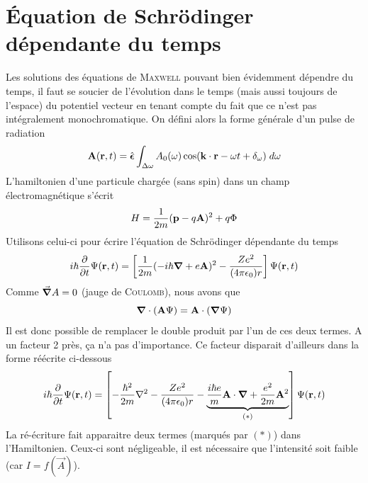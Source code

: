 \section{Équation de Schrödinger dépendante du temps}
Les solutions des équations de \textsc{Maxwell} pouvant bien évidemment dépendre du temps, il faut se
soucier de l'évolution dans le temps (mais aussi toujours de l'espace) du potentiel vecteur en tenant
compte du fait que ce n'est pas intégralement monochromatique. On défini alors la forme générale d'un
pulse de radiation
\begin{equation}
  {\bf A} ({\bf r}, t) 
= \hat{  \mbox{\boldmath $ \epsilon $}}
\int_{\Delta \omega} A_0 (\omega) 
   \cos ( {\bf k} \cdot {\bf r} - \omega t + 
\delta_{\omega} )  \; d \omega
\end{equation}
L'hamiltonien d'une particule chargée (sans spin) dans un champ électromagnétique s'écrit
\begin{equation}
H = \frac{1}{2m} ({\bf p} - q {\bf A} ) ^2 + q \Phi
\end{equation}
Utilisons celui-ci pour écrire l'équation de Schrödinger dépendante du temps
\begin{equation}
i \hbar \frac{\partial}{\partial t} \Psi ({\bf r}, t)
= \left[ \frac{1}{2m} (-i \hbar  \mbox{\boldmath $ \nabla $} + e {\bf A}) ^2
  - \frac{Ze^2}{(4 \pi \epsilon_0) r } \right] \Psi ({\bf r}, t)
\end{equation}
Comme $\vec\grad A=0$ (jauge de \textsc{Coulomb}), nous avons que
\begin{equation}
 \mbox{\boldmath $ \nabla $} \cdot ({\bf A} \Psi )
= {\bf A} \cdot (  \mbox{\boldmath $ \nabla $} \Psi)
\end{equation}
Il est donc possible de remplacer le double produit par l'un de ces deux termes. A un facteur 2 près,
ça n'a pas d'importance. Ce facteur disparait d'ailleurs dans la forme réécrite ci-dessous
\begin{equation}
i \hbar \frac{\partial}{\partial t} \Psi ({\bf r}, t) =\left[ -\frac{\hbar ^2}{2m} \nabla ^2 - \frac{Ze^2}{(4 \pi \epsilon_0) r } 
  - \underbrace{\frac{i \hbar e}{m} {\bf A} \cdot \mbox{\boldmath $ \nabla $} 
  + \frac{e^2}{2m} {\bf A} ^2}_{(*)} \right] \Psi ({\bf r}, t)
\end{equation}
La ré-écriture fait apparaitre deux termes (marqués par $(*)$) dans l'Hamiltonien. Ceux-ci sont 
négligeable, il est nécessaire que l'intensité soit faible (car $I = f(\vec{A})$).\\


